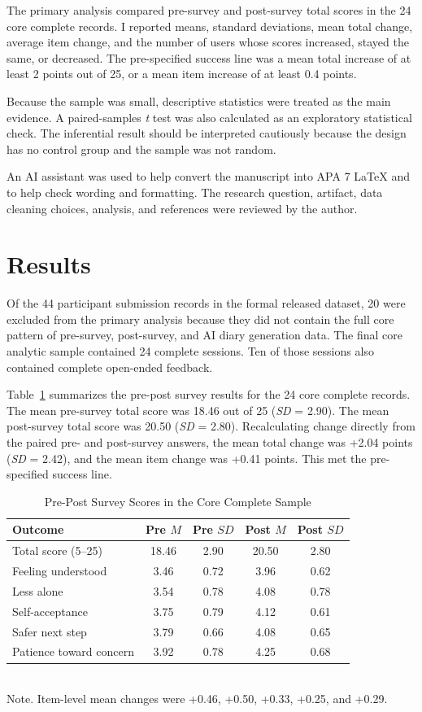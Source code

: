 The primary analysis compared pre-survey and post-survey total scores in the 24 core complete records. I reported means, standard deviations, mean total change, average item change, and the number of users whose scores increased, stayed the same, or decreased. The pre-specified success line was a mean total increase of at least 2 points out of 25, or a mean item increase of at least 0.4 points.

Because the sample was small, descriptive statistics were treated as the main evidence. A paired-samples \textit{t} test was also calculated as an exploratory statistical check. The inferential result should be interpreted cautiously because the design has no control group and the sample was not random.

An AI assistant was used to help convert the manuscript into APA 7 LaTeX and to help check wording and formatting. The research question, artifact, data cleaning choices, analysis, and references were reviewed by the author.

\section{Results}

Of the 44 participant submission records in the formal released dataset, 20 were excluded from the primary analysis because they did not contain the full core pattern of pre-survey, post-survey, and AI diary generation data. The final core analytic sample contained 24 complete sessions. Ten of those sessions also contained complete open-ended feedback.

Table~\ref{tab:prepost} summarizes the pre-post survey results for the 24 core complete records. The mean pre-survey total score was 18.46 out of 25 (\textit{SD} = 2.90). The mean post-survey total score was 20.50 (\textit{SD} = 2.80). Recalculating change directly from the paired pre- and post-survey answers, the mean total change was +2.04 points (\textit{SD} = 2.42), and the mean item change was +0.41 points. This met the pre-specified success line.

\begin{table}
\caption{Pre-Post Survey Scores in the Core Complete Sample}
\label{tab:prepost}
\begin{tabular}{lcccc}
\toprule
Outcome & Pre $M$ & Pre $SD$ & Post $M$ & Post $SD$ \\
\midrule
Total score (5--25) & 18.46 & 2.90 & 20.50 & 2.80 \\
Feeling understood & 3.46 & 0.72 & 3.96 & 0.62 \\
Less alone & 3.54 & 0.78 & 4.08 & 0.78 \\
Self-acceptance & 3.75 & 0.79 & 4.12 & 0.61 \\
Safer next step & 3.79 & 0.66 & 4.08 & 0.65 \\
Patience toward concern & 3.92 & 0.78 & 4.25 & 0.68 \\
\bottomrule
\end{tabular}
\\
\small Note. Item-level mean changes were +0.46, +0.50, +0.33, +0.25, and +0.29.
\end{table}


